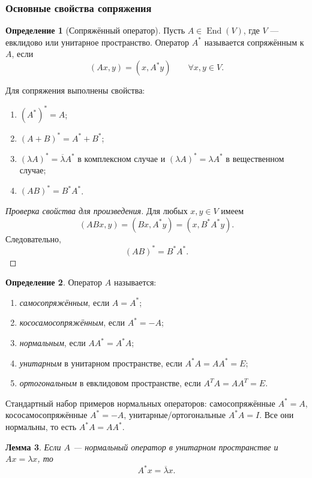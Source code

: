 \documentclass[12pt,a4paper]{article}
\theoremstyle{definition}
\newtheorem{definition}{Определение}[section]
\theoremstyle{plain}
\newtheorem{lemma}[definition]{Лемма}
\theoremstyle{remark}
\newenvironment{knowledgefix}{\begin{clarifybox}}{\end{clarifybox}}
\newcommand{\End}{\operatorname{End}}
\begin{document}
\subsubsection*{Основные свойства сопряжения}

\begin{definition}[Сопряжённый оператор]
Пусть $A\in\End(V)$, где $V$ --- евклидово или унитарное пространство.
Оператор $A^*$ называется сопряжённым к $A$, если
\[
    (Ax,y)=(x,A^*y)
    \qquad \forall x,y\in V.
\]
\end{definition}

Для сопряжения выполнены свойства:
\begin{enumerate}[label=\arabic*)]
    \item $(A^*)^*=A$;
    \item $(A+B)^*=A^*+B^*$;
    \item $(\lambda A)^*=\overline{\lambda}A^*$ в комплексном случае и $(\lambda A)^*=\lambda A^*$ в вещественном случае;
    \item $(AB)^*=B^*A^*$.
\end{enumerate}

\begin{proof}[Проверка свойства для произведения]
Для любых $x,y\in V$ имеем
\[
    (ABx,y)=(Bx,A^*y)=(x,B^*A^*y).
\]
Следовательно,
\[
    (AB)^*=B^*A^*.
\]
\end{proof}

\begin{definition}
Оператор $A$ называется:
\begin{enumerate}[label=\arabic*)]
    \item \emph{самосопряжённым}, если $A=A^*$;
    \item \emph{кососамосопряжённым}, если $A^*=-A$;
    \item \emph{нормальным}, если $AA^*=A^*A$;
    \item \emph{унитарным} в унитарном пространстве, если $A^*A=AA^*=E$;
    \item \emph{ортогональным} в евклидовом пространстве, если $A^TA=AA^T=E$.
\end{enumerate}
\begin{knowledgefix}
Стандартный набор примеров нормальных операторов: самосопряжённые \(A^*=A\), кососамосопряжённые \(A^*=-A\), унитарные/ортогональные \(A^*A=I\). Все они нормальны, то есть \(A^*A=AA^*\).
\end{knowledgefix}
\end{definition}

\begin{lemma}
Если $A$ --- нормальный оператор в унитарном пространстве и $Ax=\lambda x$, то
\[
    A^*x=\overline{\lambda}x.
\]
\end{lemma}
\end{document}
